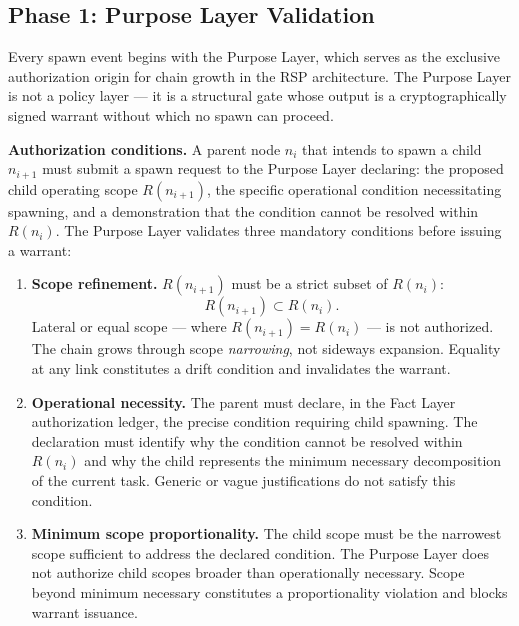 \subsection{Phase 1: Purpose Layer Validation}
\label{sec:rs-purpose-layer}

Every spawn event begins with the Purpose Layer, which serves as the exclusive authorization origin for chain growth in the RSP architecture. The Purpose Layer is not a policy layer — it is a structural gate whose output is a cryptographically signed warrant without which no spawn can proceed.

\medskip
\noindent\textbf{Authorization conditions.} A parent node $n_i$ that intends to spawn a child $n_{i+1}$ must submit a spawn request to the Purpose Layer declaring: the proposed child operating scope $R(n_{i+1})$, the specific operational condition necessitating spawning, and a demonstration that the condition cannot be resolved within $R(n_i)$. The Purpose Layer validates three mandatory conditions before issuing a warrant:

\begin{enumerate}
    \item[(P1)] \textbf{Scope refinement.} $R(n_{i+1})$ must be a strict subset of $R(n_i)$:
    \begin{equation}
    R(n_{i+1}) \subset R(n_i).
    \label{eq:scope-refinement}
    \end{equation}
    Lateral or equal scope — where $R(n_{i+1}) = R(n_i)$ — is not authorized. The chain grows through scope \emph{narrowing}, not sideways expansion. Equality at any link constitutes a drift condition and invalidates the warrant.

    \item[(P2)] \textbf{Operational necessity.} The parent must declare, in the Fact Layer authorization ledger, the precise condition requiring child spawning. The declaration must identify why the condition cannot be resolved within $R(n_i)$ and why the child represents the minimum necessary decomposition of the current task. Generic or vague justifications do not satisfy this condition.

    \item[(P3)] \textbf{Minimum scope proportionality.} The child scope must be the narrowest scope sufficient to address the declared condition. The Purpose Layer does not authorize child scopes broader than operationally necessary. Scope beyond minimum necessary constitutes a proportionality violation and blocks warrant issuance.
\end{enumerate}

